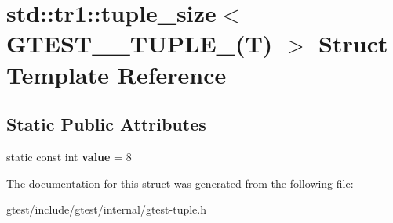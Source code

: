 \hypertarget{structstd_1_1tr1_1_1tuple__size_3_01GTEST__8__TUPLE___07T_08_01_4}{}\section{std\+:\+:tr1\+:\+:tuple\+\_\+size$<$ G\+T\+E\+S\+T\+\_\+\_\+\+T\+U\+P\+L\+E\+\_\+(T) $>$ Struct Template Reference}
\label{structstd_1_1tr1_1_1tuple__size_3_01GTEST__8__TUPLE___07T_08_01_4}
\subsection*{Static Public Attributes}
\begin{DoxyCompactItemize}
\item 
\mbox{\label{structstd_1_1tr1_1_1tuple__size_3_01GTEST__8__TUPLE___07T_08_01_4_a71abbf8156b1b110d3b8894ce02a44d8}} 
static const int {\bfseries value} = 8
\end{DoxyCompactItemize}


The documentation for this struct was generated from the following file\+:\begin{DoxyCompactItemize}
\item 
gtest/include/gtest/internal/gtest-\/tuple.\+h\end{DoxyCompactItemize}
